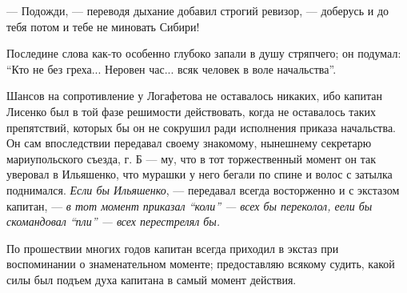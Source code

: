 \documentclass[a4paper,20pt]{report}
\begin{document}
— Подожди, — переводя дыхание добавил строгий ревизор, — доберусь и до тебя потом и тебе не миновать Сибири!

Последине слова как-то особенно глубоко запали в
душу стряпчего; он подумал: ``Кто не без греха... Неровен час... всяк человек 
в воле начальства''.

Шансов на сопротивление у Логафетова не оставалось
никаких, ибо капитан Лисенко был в той фазе решимости действовать, 
когда не оставалось таких препятствий,
которых бы он не сокрушил ради исполнения приказа начальства. Он сам впоследствии передавал 
своему знакомому, нынешнему секретарю мариупольского съезда, г. Б — му,
что в тот торжественный момент он так уверовал в
Ильяшенко, что мурашки у него бегали по спине и волос
с затылка поднимался. \emph{Если бы Ильяшенко}, — передавал
всегда восторженно и с экстазом капитан, — \emph{в тот момент приказал ``коли'' — всех бы переколол, еели бы
скомандовал ``пли'' — всех перестрелял бы.}

По прошествии многих годов капитан всегда приходил в экстаз при воспоминании 
о знаменательном моменте; предоставляю всякому судить, какой силы был подъем духа 
капитана в самый момент действия.
\end{document}
